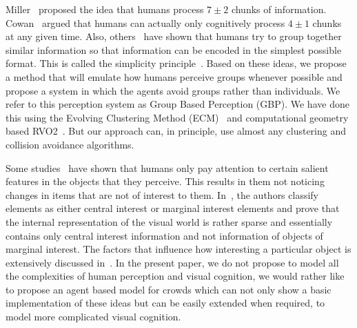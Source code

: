 \documentclass[runningheads,a4paper]{llncs}
\begin{document}
Miller~\cite{Miller:1956tr} proposed the idea that humans process $7\pm 2$ chunks of information. Cowan~\cite{Cowan:2001wi} argued that humans can actually only cognitively process $4\pm 1$ chunks at any given time. Also, others~\cite{Hochberg:1953eh} have shown that humans try to group together similar information so that information can be encoded in the simplest possible format. This is called the simplicity principle~\cite{Hochberg:1953eh}. Based on these ideas, we propose a method that will emulate how humans perceive groups whenever possible and propose a system in which the agents avoid groups rather than individuals. We refer to this perception system as Group Based Perception (GBP). We have done this using the Evolving Clustering Method (ECM)~\cite{Song:2001vg} and computational geometry based RVO2~\cite{Guy:2010ko}. But our approach can, in principle, use almost any clustering and collision avoidance algorithms. 

Some studies~\cite{Itti:2001wa,OReagan:1999wj,Triesch:2003vz} have shown that humans only pay attention to certain salient features in the objects that they perceive. This results in them not noticing changes in items that are not of interest to them. In~\cite{OReagan:1999wj}, the authors classify elements as either central interest or marginal interest elements and prove that the internal representation of the visual world is rather sparse and essentially contains only central interest information and not information of objects of marginal interest. The factors that influence how interesting a particular object is extensively discussed in~\cite{Itti:2001wa}. In the present paper, we do not propose to model all the complexities of human perception and visual cognition, we would rather like to propose an agent based model for crowds which can not only show a basic implementation of these ideas but can be easily extended when required, to model more complicated visual cognition.
\end{document}
